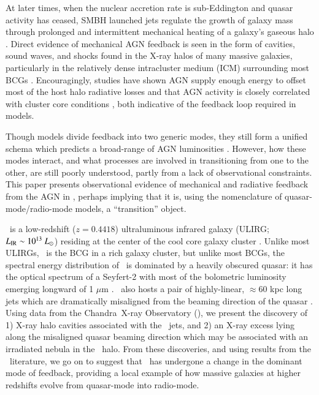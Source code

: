 \documentclass[referee,traditabstract]{aa}
\begin{document}
At later times, when the nuclear accretion rate is sub-Eddington and
quasar activity has ceased, SMBH launched jets regulate the growth of
galaxy mass through prolonged and intermittent mechanical heating of a
galaxy's gaseous halo \citep[\eg][]{2005MNRAS.363....2K,
  2006MNRAS.368....2D}. Direct evidence of mechanical AGN feedback is
seen in the form of cavities, sound waves, and shocks found in the
X-ray halos of many massive galaxies, particularly in the relatively
dense intracluster medium (ICM) surrounding most BCGs
\citep[\eg][]{perseus1, hydraa0, 2001ApJ...554..261C,
  2007ApJ...665.1057F, 2008MNRAS.390L..93S}. Encouragingly, studies
have shown AGN supply enough energy to offset most of the host halo
radiative losses \citep[\eg][]{perseus2, birzan04, dunn06} and that
AGN activity is closely correlated with cluster core conditions
\citep[\eg][]{haradent, rafferty08}, both indicative of the feedback
loop required in models.

Though models divide feedback into two generic modes, they still form
a unified schema \citep[\eg][]{sijacki07} which predicts a broad-range
of AGN luminosities \citep[\eg][]{2009ApJ...698.1550H}. However, how
these modes interact, and what processes are involved in transitioning
from one to the other, are still poorly understood, partly from a lack
of observational constraints. This paper presents observational
evidence of mechanical and radiative feedback from the AGN in \irs,
perhaps implying that it is, using the nomenclature of
quasar-mode/radio-mode models, a ``transition'' object.

\irs\ is a low-redshift ($z = 0.4418$) ultraluminous infrared galaxy
(ULIRG; $L_{\rm{IR}} \sim 10^{13} ~L_{\odot}$) residing at the center of
the cool core galaxy cluster \object{\rxj}. Unlike most ULIRGs,
\irs\ is the BCG in a rich galaxy cluster, but unlike most BCGs, the
spectral energy distribution of \irs\ is dominated by a heavily
obscured quasar: it has the optical spectrum of a Seyfert-2 with most
of the bolometric luminosity emerging longward of 1 $\mu$m
\citep{1988ApJ...328..161K, 1993ApJ...415...82H, 1994ApJ...436L..51F,
  1998ApJ...506..205E, 2000A&A...353..910F,
  2001MNRAS.321L..15I}. \irs\ also hosts a pair of highly-linear,
$\approx 60$ kpc long jets which are dramatically misaligned from the
beaming direction of the quasar \citep[][hereafter H93 and H99,
  respectively]{1993ApJ...415...82H, 1999ApJ...512..145H}. Using data
from the Chandra\ X-ray Observatory (\cxo), we present the discovery
of 1) X-ray halo cavities associated with the \irs\ jets, and 2) an
X-ray excess lying along the misaligned quasar beaming direction which
may be associated with an irradiated nebula in the \irs\ halo. From
these discoveries, and using results from the \irs\ literature, we go
on to suggest that \irs\ has undergone a change in the dominant mode
of feedback, providing a local example of how massive galaxies at
higher redshifts evolve from quasar-mode into radio-mode.
\end{document}
